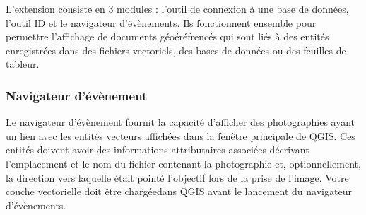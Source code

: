 
L'extension consiste en 3 modules : l'outil de connexion à une base de données, l'outil ID et le navigateur d'évènements. Ils fonctionnent ensemble pour permettre l'affichage de documents géoéréfrencés qui sont liés à des entités enregistrées dans des fichiers vectoriels, des bases de données ou des feuilles de tableur.

\subsubsection{Navigateur d'évènement}\label{evis_browser}


Le navigateur d'évènement fournit la capacité d'afficher des photographies ayant un lien avec les entités vecteurs affichées dans la fenêtre principale de QGIS. Ces entités doivent avoir des informations attributaires associées décrivant l'emplacement et le nom du fichier contenant la photographie et, optionnellement, la direction vers laquelle était pointé l'objectif lors de la prise de l'image. Votre couche vectorielle doit être chargéedans QGIS avant le lancement du navigateur d'évènements.

\label{evis_launch_browser}


